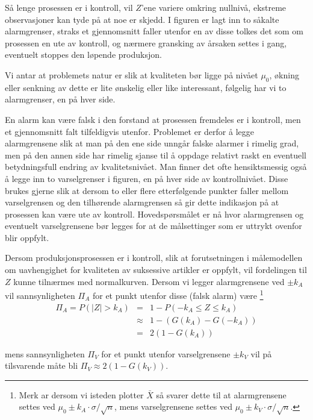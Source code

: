 \noindent Så lenge prosessen er i kontroll, vil $Z$'ene variere omkring 
nullnivå, ekstreme observasjoner kan tyde på at noe er skjedd.  
I figuren er lagt inn to såkalte alarmgrenser, straks et gjennomsnitt
faller utenfor en av disse tolkes det som om prosessen en ute av kontroll,
og nærmere gransking av årsaken settes i gang, eventuelt stoppes
den løpende produksjon.

Vi antar at problemets natur er slik at kvaliteten bør ligge på 
nivået ${\mu}_0$, økning eller senkning av dette er lite ønskelig
eller like interessant, følgelig har vi to alarmgrenser, en på
hver side.

En alarm kan være falsk i den forstand at prosessen fremdeles er i
kontroll, men et gjennomsnitt falt tilfeldigvis utenfor.  Problemet er
derfor å legge alarmgrensene slik at man på den ene side unngår
falske alarmer i rimelig grad, men på den annen side har rimelig 
sjanse til å oppdage relativt raskt en eventuell betydningsfull
endring av kvalitetsnivået.  Man finner det ofte hensiktsmessig også
å legge inn to varselgrenser i figuren, en på hver side av 
kontrollnivået.  Disse brukes gjerne slik at dersom to eller flere
etterfølgende punkter faller mellom varselgrensen og den tilhørende
alarmgrensen så gir dette indikasjon på at prosessen kan være
ute av kontroll.  Hovedspørsmålet er nå hvor alarmgrensen og 
eventuelt varselgrensene bør legges for at de målsettinger som er
uttrykt ovenfor blir oppfylt.

Dersom produksjonsprosessen er i kontroll, slik at forutsetningen i 
måle\-modellen om uavhengighet for kvaliteten av suksessive artikler er
 oppfylt, vil fordelingen til $Z$ kunne tilnærmes med 
normalkurven.  Dersom vi legger alarmgrensene ved $ \pm k_A$ vil
sannsynligheten ${\Pi}_A$ for et punkt utenfor disse (falsk alarm)
være \footnote{Merk ar dersom vi isteden plotter $\bar{X}$ så
svarer dette til at alarmgrensene settes ved 
${\mu}_0 \pm k_A \cdot \sigma /\sqrt{n}$,
 mens varselgrensene settes ved ${\mu}_0 \pm k_V \cdot \sigma /\sqrt{n}$.}
\begin{eqnarray*}
{\Pi}_A=P(\mid Z \mid > k_A)&=&1-P(-k_A\leq Z\leq k_A) \\
                    &\approx & 1-(G(k_A)-G(-k_A)) \\
                    &=&2(1-G(k_A))
\end{eqnarray*}

\noindent mens sannsynligheten ${\Pi}_V$ for et punkt utenfor varselgrensene
$ \pm k_V$ vil på tilsvarende måte bli 
${\Pi}_V \approx 2(1 - G(k_V))$.


